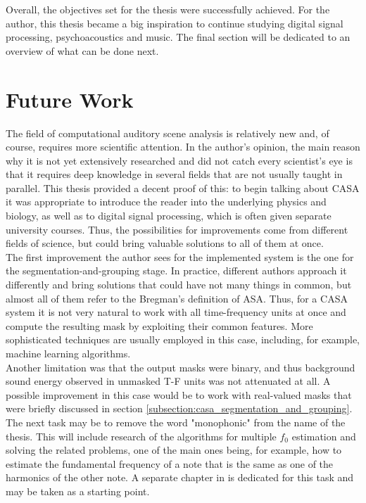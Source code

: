 Overall, the objectives set for the thesis were successfully achieved. For the author, this thesis became a big inspiration to continue studying digital signal processing, psychoacoustics and music. The final section will be dedicated to an overview of what can be done next.

\section{Future Work}

The field of computational auditory scene analysis is relatively new and, of course, requires more scientific attention. In the author's opinion, the main reason why it is not yet extensively researched and did not catch every scientist's eye is that it requires deep knowledge in several fields that are not usually taught in parallel. This thesis provided a decent proof of this: to begin talking about CASA it was appropriate to introduce the reader into the underlying physics and biology, as well as to digital signal processing, which is often given separate university courses. Thus, the possibilities for improvements come from different fields of science, but could bring valuable solutions to all of them at once.\\

The first improvement the author sees for the implemented system is the one for the segmen\-tation-and-grouping stage. In practice, different authors approach it differently and bring solutions that could have not many things in common, but almost all of them refer to the Bregman's definition of ASA. Thus, for a CASA system it is not very natural to work with all time-frequency units at once and compute the resulting mask by exploiting their common features. More sophisticated techniques are usually employed in this case, including, for example, machine learning algorithms.\\

Another limitation was that the output masks were binary, and thus background sound energy observed in unmasked T-F units was not attenuated at all. A possible improvement in this case would be to work with real-valued masks that were briefly discussed in section \ref{subsection:casa_segmentation_and_grouping}.\\

The next task may be to remove the word "monophonic" from the name of the thesis. This will include research of the algorithms for multiple $f_0$ estimation and solving the related problems, one of the main ones being, for example, how to estimate the fundamental frequency of a note that is the same as one of the harmonics of the other note. A separate chapter in \cite{Wang2006} is dedicated for this task and may be taken as a starting point.\\

